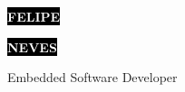 \documentclass[9pt]{developercv} %
\begin{document}

\begin{minipage}[t]{0.5\textwidth} %
	\vspace{-\baselineskip} %
	
	\colorbox{black}{{\HUGE\textcolor{white}{\textbf{\MakeUppercase{Felipe}}}}} %
	
	\colorbox{black}{{\HUGE\textcolor{white}{\textbf{\MakeUppercase{Neves}}}}} %
	
	\vspace{6pt}
	
	{\huge Embedded Software Developer} %
\end{minipage}
\begin{minipage}[t]{0.5\textwidth} %
	\vspace{-\baselineskip} %
	
	\\
	\\
	\\	
\end{minipage}

\vspace{0.5cm}

\end{document}
